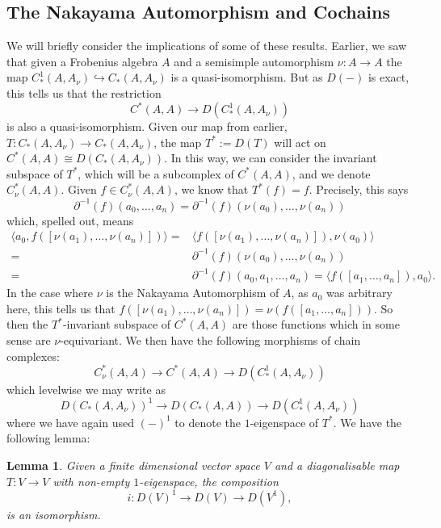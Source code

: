 \documentclass{article}
\theoremstyle{plain}
\newtheorem{lemma}[theorem]{Lemma}
\theoremstyle{definition}
\begin{document}
\subsection{The Nakayama Automorphism and Cochains}\label{NakayamaCochains}
We will briefly consider the implications of some of these results. Earlier, we saw that given a Frobenius algebra $A$ and a semisimple automorphism $\nu:A \rightarrow A$ the map $C^1_*(A,A_\nu) \hookrightarrow C_*(A,A_\nu)$ is a quasi-isomorphism. But as $D(-)$ is exact, this tells us that the restriction
$$C^*(A,A) \rightarrow D(C^1_*(A,A_\nu))$$
is also a quasi-isomorphism. Given our map from earlier, $T:C_*(A,A_\nu) \rightarrow C_*(A,A_\nu)$, the map $T^*:=D(T)$ will act on $C^*(A,A)\cong D(C_*(A,A_\nu))$. In this way, we can consider the invariant subspace of $T^*$, which will be a subcomplex of $C^*(A,A)$, and we denote $C^*_\nu(A,A)$. Given $f \in C^*_\nu(A,A)$, we know that $T^*(f) =f$. Precisely, this says
$$ \partial^{-1}(f)(a_0,\ldots,a_n) = \partial^{-1}(f)(\nu(a_0), \ldots, \nu(a_n))$$
which, spelled out, means
$$\begin{aligned}  
\langle a_0 , f([\nu(a_1), \ldots, \nu(a_n)]) \rangle =&\langle f([\nu(a_1), \ldots, \nu(a_n)]), \nu(a_0) \rangle \\
=& \partial^{-1}(f)(\nu(a_0), \ldots, \nu(a_n)) \\
=&  \partial^{-1}(f)(a_0, a_1, \ldots, a_n) = \langle f([a_1, \ldots, a_n]), a_0 \rangle. \end{aligned}$$
In the case where $\nu$ is the Nakayama Automorphism of $A$, as $a_0$ was arbitrary here, this tells us that $ f([\nu(a_1), \ldots, \nu(a_n)]) = \nu(f([a_1,\ldots, a_n]))$. So then the $T^*$-invariant subspace of $C^*(A,A)$ are those functions which in some sense are $\nu$-equivariant. We then have the following morphisms of chain complexes:
$$C^*_\nu(A,A) \rightarrow C^*(A,A) \rightarrow D(C_*^1(A,A_\nu))$$
which levelwise we may write as 
$$D(C_*(A,A_\nu))^1 \rightarrow D(C_*(A,A)) \rightarrow D(C_*^1(A,A_\nu))$$
where we have again used $(-)^1$ to denote the $1$-eigenspace of $T^*$. We have the following lemma:
\begin{lemma} Given a finite dimensional vector space $V$ and a diagonalisable map $T:V \rightarrow V$ with non-empty $1$-eigenspace, the composition
$$i:D(V)^1 \rightarrow D(V) \rightarrow D(V^1),$$
is an isomorphism.\end{lemma}
\end{document}
